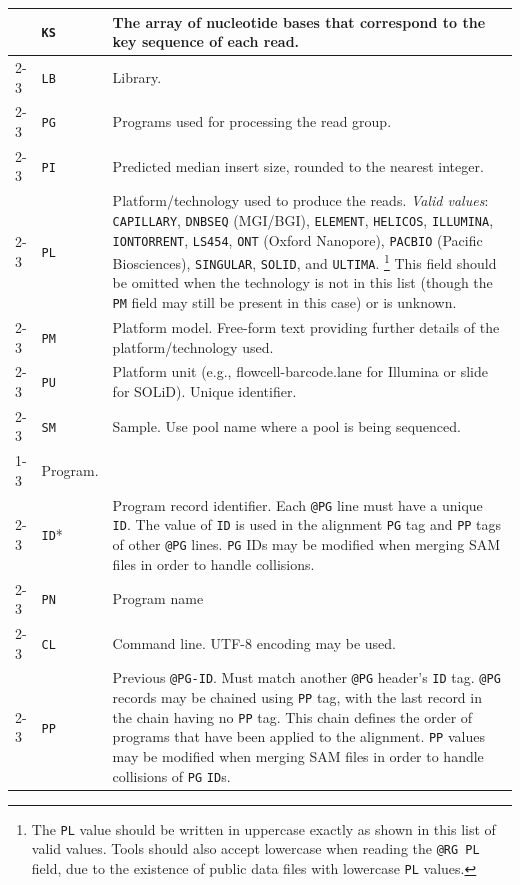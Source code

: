 \documentclass[10pt]{article}
\begin{document}
\begin{center}
\begin{longtable}{|l|l|p{13.5cm}|}
  & {\tt KS} & The array of nucleotide bases that correspond to the key sequence of each read.\\\cline{2-3}
  & {\tt LB} & Library.\\\cline{2-3}
  & {\tt PG} & Programs used for processing the read group.\\\cline{2-3}
  & {\tt PI} & Predicted median insert size, rounded to the nearest integer.\\\cline{2-3}
  & {\tt PL} & Platform/technology used to produce the reads. \emph{Valid values}:
  {\tt CAPILLARY}, {\tt DNBSEQ} (MGI/BGI), {\tt ELEMENT}, {\tt HELICOS}, {\tt ILLUMINA}, {\tt IONTORRENT}, {\tt LS454}, {\tt ONT} (Oxford Nanopore), {\tt PACBIO} (Pacific Biosciences), {\tt SINGULAR}, {\tt SOLID}, and {\tt ULTIMA}.%
\footnote{The {\tt PL} value should be written in uppercase exactly as shown in this list of valid values.
Tools should also accept lowercase when reading the {\tt @RG PL} field, due to the existence of public data files with lowercase {\tt PL} values.}
  This field should be omitted when the technology is not in this list (though the {\tt PM} field may still be present in this case) or is unknown.\\\cline{2-3}
  & {\tt PM} & Platform model. Free-form text providing further details of the platform/technology used.\\\cline{2-3}
  & {\tt PU} & Platform unit (e.g., flowcell-barcode.lane for Illumina or slide for SOLiD). Unique identifier.\\\cline{2-3}
  & {\tt SM} & Sample. Use pool name where a pool is being sequenced.\\\cline{1-3}
  \multicolumn{2}{|l}{\tt @PG} & Program. \\\cline{2-3}
  & {\tt ID}* & Program record identifier. Each {\tt @PG} line must have a unique {\tt ID}.
  	The value of {\tt ID} is used in the alignment {\tt PG} tag and {\tt PP} tags of other {\tt @PG} lines.
	{\tt PG} IDs may be modified when merging SAM files in order to handle collisions.\\\cline{2-3}
  & {\tt PN} & Program name \\\cline{2-3}
  & {\tt CL} & Command line.  UTF-8 encoding may be used. \\\cline{2-3}
  & {\tt PP} & Previous {\tt @PG-ID}. Must match another {\tt @PG} header's {\tt ID} tag.
  	{\tt @PG} records may be chained using {\tt PP} tag, with the last record in the chain
	having no {\tt PP} tag. This chain defines the order of programs that have been applied to the alignment.
	{\tt PP} values may be modified when merging SAM files in order to handle collisions of {\tt PG} {\tt ID}s.

\end{longtable}
\end{center}
\end{document}
